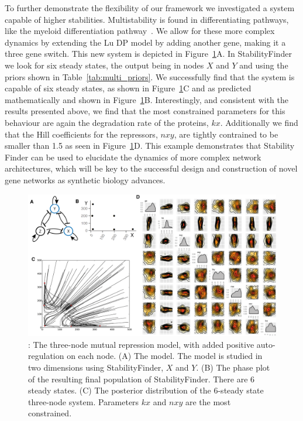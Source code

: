 {To further demonstrate the flexibility of our framework we investigated a system capable of higher stabilities. Multistability is found in differentiating pathways, like the myeloid differentiation pathway~\autocite{Ghaffarizadeh:2014bt, Cinquin:2005go}. We allow for these more complex dynamics by extending the Lu DP model by adding another gene, making it a three gene switch.  This new system is depicted in Figure~\ref{fig:fig8}A. In StabilityFinder we look for six steady states, the output being in nodes $X$ and $Y$ and using the priors shown in Table~\ref{tab:multi_priors}. We successfully find that the system is capable of six steady states, as shown in Figure~\ref{fig:fig8}C and as predicted mathematically and shown in Figure~\ref{fig:fig8}B. Interestingly, and consistent with the results presented above, we find that the most constrained parameters for this behaviour are again the degradation rate of the proteins, $kx$. Additionally we find that the Hill coefficients for the repressors, $nxy$, are tightly contrained to be smaller than 1.5 as seen in Figure~\ref{fig:fig8}D. This example demonstrates that Stability Finder can be used to elucidate the dynamics of more complex network architectures, which will be key to the successful design and construction of novel gene networks as synthetic biology advances.

\begin{figure}[h]
\begin{center}
\includegraphics[scale=0.6]{chapterStabilityFinder/images/lu_6ss.png}
\caption[LoF caption]{ \label{fig:fig8}: The three-node mutual repression model, with added positive auto-regulation on each node. (A) The model. The model is studied in two dimensions using StabilityFinder, $X$ and $Y$. (B) The phase plot of the resulting final population of StabilityFinder. There are 6 steady states. (C) The posterior distribution of the 6-steady state three-node system. Parameters $kx$ and $nxy$ are the most constrained.}
\end{center}
\end{figure}




}
